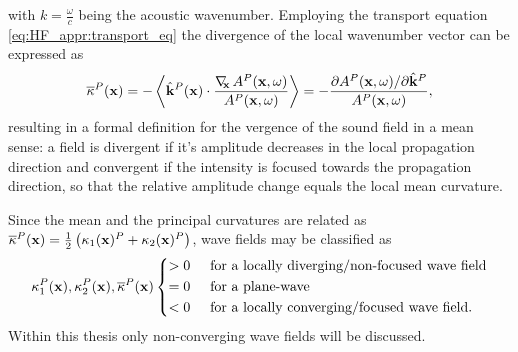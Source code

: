 with $k = \frac{\omega}{c}$ being the acoustic wavenumber.
Employing the transport equation \eqref{eq:HF_appr:transport_eq} the divergence of the local wavenumber vector can be expressed as
\begin{equation}
\overline{\kappa}^P(\mathbf{x})
= -\left< \hat{\mathbf{k}}^P(\mathbf{x})\cdot \frac{ \nabla_{\!\!\mathbf{x}}\, A^P(\mathbf{x},\omega) }{A^P(\mathbf{x},\omega)}\right>
= -\frac{ \partial A^P(\mathbf{x},\omega) / \partial \hat{\mathbf{k}}^P }{ A^P(\mathbf{x},\omega)},
\end{equation}
resulting in a formal definition for the vergence of the sound field in a mean sense: a field is divergent if it's amplitude decreases in the local propagation direction and convergent if the intensity is focused towards the propagation direction, so that the relative amplitude change equals the local mean curvature.

Since the mean and the principal curvatures are related as $\overline{\kappa}^P(\mathbf{x})  = \frac{1}{2} \left( \kappa_1(\mathbf{x})^P+\kappa_2(\mathbf{x})^P \right)$, wave fields may be classified as
\begin{equation}
\label{eq:HF_appr:curvature_cases}
\kappa_1^P(\vx),\kappa_2^P(\vx),\overline{\kappa}^P(\vx) 
\begin{cases*}
> 0  \hspace{5mm} \text{for a locally diverging/non-focused wave field} \\
= 0  \hspace{5mm} \text{for a plane-wave}  \\
< 0  \hspace{5mm} \text{for a locally converging/focused wave field.} 
\end{cases*}
\end{equation}
Within this thesis only non-converging wave fields will be discussed.

